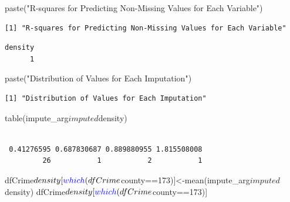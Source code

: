 \documentclass[]{article}
\newenvironment{Shaded}{}{}
\newcommand{\DecValTok}[1]{#1}
\newcommand{\KeywordTok}[1]{\textcolor[rgb]{0.00,0.00,1.00}{#1}}
\newcommand{\NormalTok}[1]{#1}
\newcommand{\OperatorTok}[1]{#1}
\newcommand{\StringTok}[1]{\textcolor[rgb]{0.00,0.50,0.50}{#1}}
\begin{document}
\begin{Shaded}
\begin{Highlighting}[]
\KeywordTok{paste}\NormalTok{(}\StringTok{"R-squares for Predicting Non-Missing Values for Each Variable"}\NormalTok{)}
\end{Highlighting}
\end{Shaded}

\begin{verbatim}
[1] "R-squares for Predicting Non-Missing Values for Each Variable"
\end{verbatim}

\begin{Shaded}
\end{Shaded}

\begin{verbatim}
density 
      1 
\end{verbatim}

\begin{Shaded}
\begin{Highlighting}[]
\KeywordTok{paste}\NormalTok{(}\StringTok{"Distribution of Values for Each Imputation"}\NormalTok{)}
\end{Highlighting}
\end{Shaded}

\begin{verbatim}
[1] "Distribution of Values for Each Imputation"
\end{verbatim}

\begin{Shaded}
\begin{Highlighting}[]
\KeywordTok{table}\NormalTok{(impute_arg}\OperatorTok{$}\NormalTok{imputed}\OperatorTok{$}\NormalTok{density)}
\end{Highlighting}
\end{Shaded}

\begin{verbatim}

 0.41276595 0.687830687 0.889880955 1.815508008 
         26           1           2           1 
\end{verbatim}

\begin{Shaded}
\begin{Highlighting}[]
\NormalTok{dfCrime}\OperatorTok{$}\NormalTok{density[}\KeywordTok{which}\NormalTok{(dfCrime}\OperatorTok{$}\NormalTok{county}\OperatorTok{==}\DecValTok{173}\NormalTok{)]<-}\KeywordTok{mean}\NormalTok{(impute_arg}\OperatorTok{$}\NormalTok{imputed}\OperatorTok{$}\NormalTok{density)}
\NormalTok{dfCrime}\OperatorTok{$}\NormalTok{density[}\KeywordTok{which}\NormalTok{(dfCrime}\OperatorTok{$}\NormalTok{county}\OperatorTok{==}\DecValTok{173}\NormalTok{)]}
\end{Highlighting}
\end{Shaded}
\end{document}

